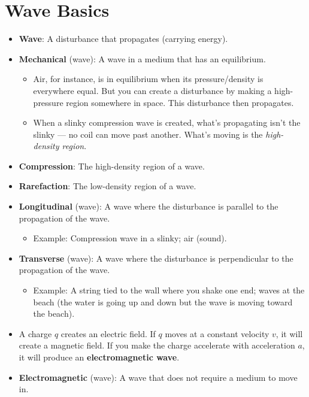 \documentclass[../notes.tex]{subfiles}
\begin{document}
\section{Wave Basics}
\begin{itemize}
    \item \textbf{Wave}: A disturbance that propagates (carrying energy).
    \item \textbf{Mechanical} (wave): A wave in a medium that has an equilibrium.
    \begin{itemize}
        \item Air, for instance, is in equilibrium when its pressure/density is everywhere equal. But you can create a disturbance by making a high-pressure region somewhere in space. This disturbance then propagates.
        \item When a slinky compression wave is created, what's propagating isn't the slinky --- no coil can move past another. What's moving is the \emph{high-density region}.
    \end{itemize}
    \item \textbf{Compression}: The high-density region of a wave.
    \item \textbf{Rarefaction}: The low-density region of a wave.
    \item \textbf{Longitudinal} (wave): A wave where the disturbance is parallel to the propagation of the wave.
    \begin{itemize}
        \item Example: Compression wave in a slinky; air (sound).
    \end{itemize}
    \item \textbf{Transverse} (wave): A wave where the disturbance is perpendicular to the propagation of the wave.
    \begin{itemize}
        \item Example: A string tied to the wall where you shake one end; waves at the beach (the water is going up and down but the wave is moving toward the beach).
    \end{itemize}
    \item A charge $q$ creates an electric field. If $q$ moves at a constant velocity $v$, it will create a magnetic field. If you make the charge accelerate with acceleration $a$, it will produce an \textbf{electromagnetic wave}.
    \item \textbf{Electromagnetic} (wave): A wave that does not require a medium to move in.
    \begin{itemize}

\end{itemize}
\end{itemize}
\end{document}
